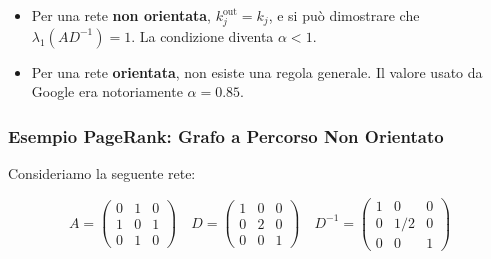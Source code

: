 	\begin{itemize}
		\item Per una rete \textbf{non orientata}, $k_j^{\text{out}} = k_j$, e si può dimostrare che $\lambda_1(A D^{-1}) = 1$. La condizione diventa $\alpha < 1$.
		\item Per una rete \textbf{orientata}, non esiste una regola generale. Il valore usato da Google era notoriamente $\alpha = 0.85$.
	\end{itemize}
	
	\subsubsection{Esempio PageRank: Grafo a Percorso Non Orientato}
	Consideriamo la seguente rete:
    \begin{figure}[h]
        \centering
    \end{figure}
	
	$$ A = \begin{pmatrix} 0 & 1 & 0 \\ 1 & 0 & 1 \\ 0 & 1 & 0 \end{pmatrix} \quad
	D = \begin{pmatrix} 1 & 0 & 0 \\ 0 & 2 & 0 \\ 0 & 0 & 1 \end{pmatrix} \quad
	D^{-1} = \begin{pmatrix} 1 & 0 & 0 \\ 0 & 1/2 & 0 \\ 0 & 0 & 1 \end{pmatrix} $$
	
